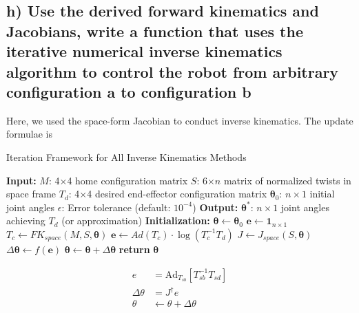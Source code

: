 \documentclass[english,10pt,a4paper]{article}
\begin{document}
    \subsection*{h) Use the derived forward kinematics and Jacobians, write a function that uses the iterative numerical inverse kinematics algorithm to control the robot from arbitrary configuration a to configuration b}
    Here, we used the space-form Jacobian to conduct inverse kinematics. The update formulae is
    \begin{algorithm}
    	\caption{Iteration Framework for All Inverse Kinematics Methods}
    	\label{alg:dls_ik}
    	\begin{algorithmic}[1]
    		\State \textbf{Input:} 
    		\State \quad $M$: 4$\times$4 home configuration matrix
    		\State \quad $S$: 6$\times n$ matrix of normalized twists in space frame
    		\State \quad $T_d$: 4$\times$4 desired end-effector configuration matrix
    		\State \quad $\mathbf{\theta}_0$: $n\times 1$ initial joint angles
    		\State \quad $\epsilon$: Error tolerance (default: $10^{-4}$)
    		\State \textbf{Output:} 
    		\State \quad $\mathbf{\theta}^*$: $n\times 1$ joint angles achieving $T_d$ (or approximation)
    		\State 
    		\State \textbf{Initialization:}
    		\State $\mathbf{\theta} \gets \mathbf{\theta}_0$ 
    		\State $\mathbf{e} \gets \mathbf{1}_{n \times 1}$ 
    		 
    		\State $T_c \gets FK_{space}(M, S, \mathbf{\theta})$ 
    		\State $\mathbf{e} \gets Ad(T_c) \cdot \log(T_c^{-1} T_d)$ 
    		\State $J \gets J_{space}(S, \mathbf{\theta})$ 
    		\State $\Delta \mathbf{\theta} \gets f(\mathbf{e})$ 
    		\State $\mathbf{\theta} \gets \mathbf{\theta} + \Delta \mathbf{\theta}$ 
    		\EndWhile
    		\State \textbf{return} $\mathbf{\theta}$ 
    	\end{algorithmic}
    \end{algorithm}
    \begin{align}
        e &= \text{Ad}_{T_{sb}} [T_{sb}^{-1}  T_{sd}]\\ \nonumber
        \Delta\theta &= J^\dagger e \\ \nonumber
        \theta &\leftarrow \theta + \Delta\theta \nonumber
    \end{align}
\end{document}
